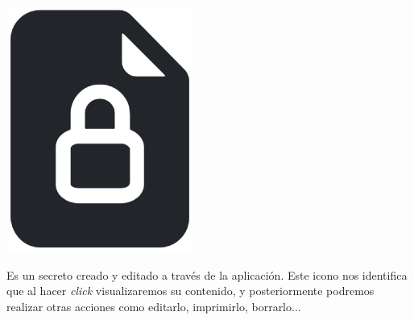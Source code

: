 \documentclass{\ClassPath/viu-tfm-template}
\begin{document}
{
    \begin{minipage}{0.1\linewidth}
        \includegraphics[width=\linewidth]{img/secret.png}
    \end{minipage}
    \hspace{0.5cm}
    \begin{minipage}{0.9\linewidth}
        Es un secreto creado y editado a través de la aplicación. Este icono nos identifica que al hacer \textit{click} visualizaremos su contenido, y posteriormente podremos realizar otras acciones como editarlo, imprimirlo, borrarlo...
    \end{minipage}
}
\end{document}
